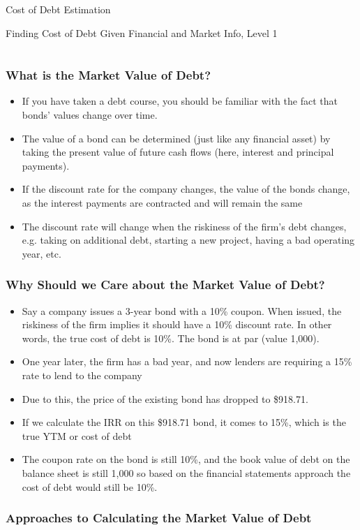 \documentclass[handout, 11pt]{beamer}
\begin{document}
\begin{section}[Debt]{Cost of Debt Estimation}
\begin{frame}
{\begin{block}{Finding Cost of Debt Given Financial and Market Info, Level 1}
\begin{tabular*}{\textwidth}{@{\extracolsep{\fill}}ccccc}
\end{tabular*}
\end{block}
}
\label{labs:dcf-cost-of-debt-lab-1}
\end{frame}
\begin{frame}
\frametitle{What is the Market Value of Debt?}
\begin{itemize}
\item If you have taken a debt course, you should be familiar with the fact that bonds' values change over time.
\vfill
\item The value of a bond can be determined (just like any financial asset) by taking the present value of future cash flows (here, interest and principal payments). 
\vfill
\item If the discount rate for the company changes, the value of the bonds change, as the interest payments are contracted and will remain the same
\vfill
\item The discount rate will change when the riskiness of the firm's debt changes, e.g. taking on additional debt, starting a new project, having a bad operating year, etc.
\end{itemize}
\end{frame}
\begin{frame}
\frametitle{Why Should we Care about the Market Value of Debt?}
\begin{itemize}
\item Say a company issues a 3-year bond with a 10\% coupon. When issued, the riskiness of the firm implies it should have a 10\% discount rate. In other words, the true cost of debt is 10\%. The bond is at par (value 1,000).
\vfill
\item One year later, the firm has a bad year, and now lenders are requiring a 15\% rate to lend to the company
\vfill
\item Due to this, the price of the existing bond has dropped to \$918.71.
\vfill
\item If we calculate the IRR on this \$918.71 bond, it comes to 15\%, which is the true YTM or cost of debt
\vfill
\item The coupon rate on the bond is still 10\%, and the book value of debt on the balance sheet is still 1,000 so based on the financial statements approach the cost of debt would still be 10\%.
\end{itemize}
\end{frame}
\begin{frame}
\frametitle{Approaches to Calculating the Market Value of Debt}
\begin{itemize}

\end{itemize}
\end{frame}
\end{section}
\end{document}
